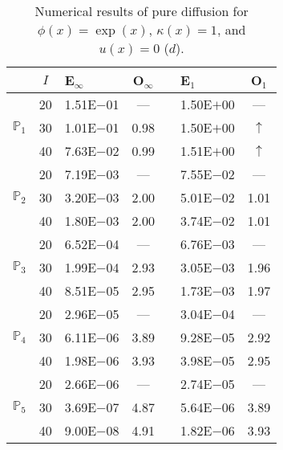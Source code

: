 \begin{table}[H]
\centering
\caption{Numerical results of pure diffusion for $\phi(x)=\exp(x)$, $\kappa(x)=1$, and $u(x)=0$ ($d$).}
\begin{tabular}{@{}l c l c c l c@{}}
\toprule
 & $I$ & E$_{\infty}$ & O$_{\infty}$ && E$_1$ & O$_1$\\
\midrule
\multirow{3}{*}{$\mathbb{P}_{1}$}
 & 20 & 1.51E$-$01 & --- && 1.50E$+$00 & ---\\
 & 30 & 1.01E$-$01 & 0.98 && 1.50E$+$00 & $\uparrow$\\
 & 40 & 7.63E$-$02 & 0.99 && 1.51E$+$00 & $\uparrow$\\
\midrule
\multirow{3}{*}{$\mathbb{P}_{2}$}
 & 20 & 7.19E$-$03 & --- && 7.55E$-$02 & ---\\
 & 30 & 3.20E$-$03 & 2.00 && 5.01E$-$02 & 1.01\\
 & 40 & 1.80E$-$03 & 2.00 && 3.74E$-$02 & 1.01\\
\midrule
\multirow{3}{*}{$\mathbb{P}_{3}$}
 & 20 & 6.52E$-$04 & --- && 6.76E$-$03 & ---\\
 & 30 & 1.99E$-$04 & 2.93 && 3.05E$-$03 & 1.96\\
 & 40 & 8.51E$-$05 & 2.95 && 1.73E$-$03 & 1.97\\
\midrule
\multirow{3}{*}{$\mathbb{P}_{4}$}
 & 20 & 2.96E$-$05 & --- && 3.04E$-$04 & ---\\
 & 30 & 6.11E$-$06 & 3.89 && 9.28E$-$05 & 2.92\\
 & 40 & 1.98E$-$06 & 3.93 && 3.98E$-$05 & 2.95\\
\midrule
\multirow{3}{*}{$\mathbb{P}_{5}$}
 & 20 & 2.66E$-$06 & --- && 2.74E$-$05 & ---\\
 & 30 & 3.69E$-$07 & 4.87 && 5.64E$-$06 & 3.89\\
 & 40 & 9.00E$-$08 & 4.91 && 1.82E$-$06 & 3.93\\
\bottomrule
\end{tabular}
\end{table}